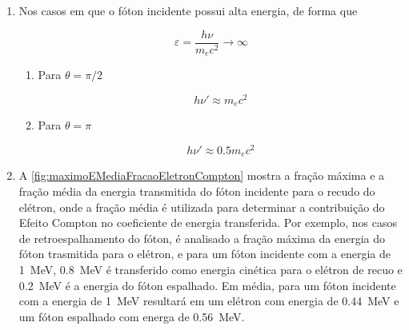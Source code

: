\documentclass[11pt,a4paper]{article}
\newcounter{exemplo}
\begin{document}
\begin{enumerate}
                    \item Nos casos em que o fóton incidente possui alta energia, de forma que
                    
                        $$\varepsilon = \frac{h\nu}{m_ec^2} \rightarrow \infty$$

                    \noindent

                        \begin{enumerate}
                            \item Para $\theta = \pi/2$
                            
                                \begin{equation}
                                    h\nu' \approx m_ec^2
                                \end{equation}

                            \item Para $\theta = \pi$
                            
                                \begin{equation}
                                    h\nu' \approx 0.5 m_ec^2
                                \end{equation}
                        \end{enumerate}

                    \item A \ref{fig:maximoEMediaFracaoEletronCompton} mostra a fração máxima e a fração média da energia transmitida do fóton incidente para o recudo do elétron, onde a fração média é utilizada para determinar a contribuição do Efeito Compton no coeficiente de energia transferida. Por exemplo, nos casos de retroespalhamento do fóton, é analisado a fração máxima da energia do fóton trasmitida para o elétron, e para um fóton incidente com a energia de \qty{1}{MeV}, \qty{0.8}{MeV} é transferido como energia cinética para o elétron de recuo e \qty{0.2}{MeV} é a energia do fóton espalhado. Em média, para um fóton incidente com a energia de \qty{1}{MeV} resultará em um elétron com energia de \qty{0.44}{MeV} e um fóton espalhado com energa de \qty{0.56}{MeV}.
                    

\end{enumerate}
\end{document}
